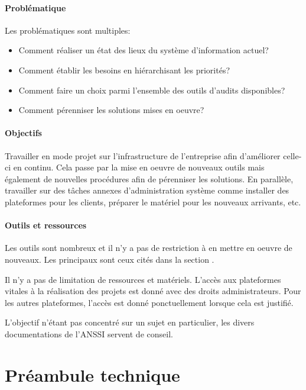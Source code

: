 \documentclass[12pt]{article}
\begin{document}
\subsection{Problématique}
Les problématiques sont multiples:
\begin{itemize}
    \item Comment réaliser un état des lieux du système d'information actuel?
    \item Comment établir les besoins en hiérarchisant les priorités?
    \item Comment faire un choix parmi l'ensemble des outils d'audits disponibles?
    \item Comment pérenniser les solutions mises en oeuvre? 
\end{itemize}

\subsection{Objectifs}
Travailler en mode projet sur l'infrastructure de l'entreprise afin d'améliorer celle-ci en continu. 
Cela passe par la mise en oeuvre de nouveaux outils mais également de nouvelles procédures afin de pérenniser les solutions. 
En parallèle, travailler sur des tâches annexes d'administration système comme installer des plateformes pour les clients, préparer le matériel pour les nouveaux arrivants, etc.

\subsection{Outils et ressources}
Les outils sont nombreux et il n'y a pas de restriction à en mettre en oeuvre de nouveaux. 
Les principaux sont ceux cités dans la section \ref{part: preambule_technique}.

Il n'y a pas de limitation de ressources et matériels.
L'accès aux plateformes vitales à la réalisation des projets est donné avec des droits administrateurs.
Pour les autres plateformes, l'accès est donné ponctuellement lorsque cela est justifié.

L'objectif n'étant pas concentré sur un sujet en particulier, les divers documentations de l'\gls{ANSSI} servent de conseil.

\newpage
\part{Préambule technique}
\label{part: preambule_technique}
\end{document}
